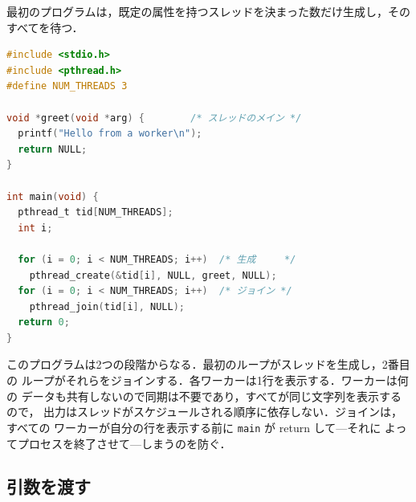 \documentclass[../main.tex]{subfiles}
\begin{document}
最初のプログラムは，既定の属性を持つスレッドを決まった数だけ生成し，その
すべてを待つ．
\begin{lstlisting}[language=C, numbers=none]
#include <stdio.h>
#include <pthread.h>
#define NUM_THREADS 3

void *greet(void *arg) {        /* スレッドのメイン */
  printf("Hello from a worker\n");
  return NULL;
}

int main(void) {
  pthread_t tid[NUM_THREADS];
  int i;

  for (i = 0; i < NUM_THREADS; i++)  /* 生成     */
    pthread_create(&tid[i], NULL, greet, NULL);
  for (i = 0; i < NUM_THREADS; i++)  /* ジョイン */
    pthread_join(tid[i], NULL);
  return 0;
}
\end{lstlisting}
このプログラムは2つの段階からなる．最初のループがスレッドを生成し，2番目の
ループがそれらをジョインする．各ワーカーは1行を表示する．ワーカーは何の
データも共有しないので同期は不要であり，すべてが同じ文字列を表示するので，
出力はスレッドがスケジュールされる順序に依存しない．ジョインは，すべての
ワーカーが自分の行を表示する前に \texttt{main} が return して---それに
よってプロセスを終了させて---しまうのを防ぐ．

\subsection{引数を渡す}
\end{document}
